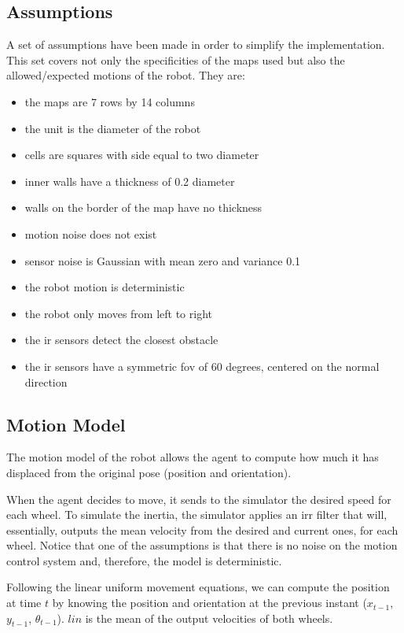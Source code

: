 \documentclass[runningheads]{llncs}
\begin{document}
\subsection{Assumptions}
\label{subsec:assumptions}

A set of assumptions have been made in order to simplify the implementation. This set covers not only the specificities of the maps used but also the allowed/expected motions of the robot. They are:

\begin{itemize}
    \item the maps are 7 rows by 14 columns
    \item the unit is the diameter of the robot
    \item cells are squares with side equal to two diameter
    \item inner walls have a thickness of 0.2 diameter
    \item walls on the border of the map have no thickness
    \item motion noise does not exist 
    \item sensor noise is Gaussian with mean zero and variance 0.1
    \item the robot motion is deterministic 
    \item the robot only moves from left to right
    \item the \Gls{ir} sensors detect the closest obstacle 
    \item the \Gls{ir} sensors have a symmetric \gls{fov} of 60 degrees, centered on the normal direction
\end{itemize}

\subsection{Motion Model}

The motion model of the robot allows the agent to compute how much it has displaced from the original pose (position and orientation).

When the agent decides to move, it sends to the simulator the desired speed for each wheel. To simulate the inertia, the simulator applies an \gls{irr} filter that will, essentially, outputs the mean velocity from the desired and current ones, for each wheel. Notice that one of the assumptions is that there is no noise on the motion control system and, therefore, the model is deterministic.

Following the linear uniform movement equations, we can compute the position at time $t$ by knowing the position and orientation at the previous instant ($x_{t-1}$, $y_{t-1}$, $\theta_{t-1}$). $lin$ is the mean of the output velocities of both wheels.
\end{document}
